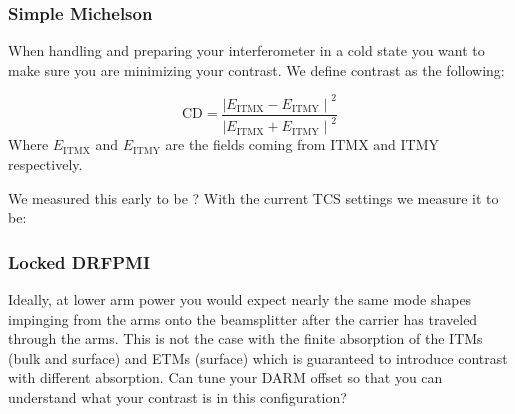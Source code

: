 
\subsubsection{Simple Michelson}
When handling and preparing your interferometer in a cold state you want to make sure you are minimizing your contrast. We define contrast as the following: 

$$ 
\mathrm{CD} = \frac{{\mid E_{\mathrm{ITMX}}-E_{\mathrm{ITMY}}\mid}^2}{{\mid E_{\mathrm{ITMX}}+E_{\mathrm{ITMY}}\mid}^2}
$$ 
Where $E_\mathrm{ITMX}$ and $E_\mathrm{ITMY}$ are the fields coming from ITMX and ITMY respectively. 

We measured this early to be ?
With the current TCS settings we measure it to be: 


\subsubsection{Locked DRFPMI}
Ideally, at lower arm power you would expect nearly the same mode shapes impinging from the arms onto the beamsplitter after the carrier has traveled through the arms. This is not the case with the finite absorption of the ITMs (bulk and surface) and ETMs (surface) which is guaranteed to introduce contrast with different absorption. Can tune your DARM offset so that you can understand what your contrast is in this configuration?
